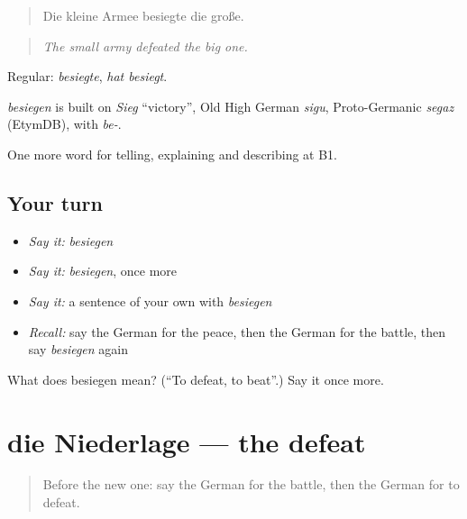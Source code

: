 \begin{quote}
Die kleine Armee besiegte die große.
\end{quote}

\begin{quote}
\emph{The small army defeated the big one.}
\end{quote}

Regular: \emph{besiegte}, \emph{hat besiegt}.

\begin{cousinweb}
\emph{besiegen} is built on \emph{Sieg} \textquotedblleft{}victory\textquotedblright{}, Old High German \emph{sigu}, Proto-Germanic \emph{segaz} (EtymDB), with \emph{be-}.
\end{cousinweb}

\begin{grammarlens}[title={What you've built}]
One more word for telling, explaining and describing at B1.
\end{grammarlens}

\subsection*{Your turn}
\begin{itemize}
\raggedright
  \item \emph{Say it:} \emph{besiegen}
  \item \emph{Say it:} \emph{besiegen}, once more
  \item \emph{Say it:} a sentence of your own with \emph{besiegen}
  \item \emph{Recall:} say the German for the peace, then the German for the battle, then say \emph{besiegen} again
\end{itemize}

\begin{tcolorbox}[breakable,colback=teal!4,colframe=teal!35!black,title={Before you move on}]
What does besiegen mean? (\textquotedblleft{}To defeat, to beat\textquotedblright{}.) Say it once more.
\end{tcolorbox}
\section[die Niederlage]{die Niederlage — the defeat}

\label{lesson:GE-C318-niederlage}



\begin{quote}
Before the new one: say the German for the battle, then the German for to defeat.
\end{quote}

